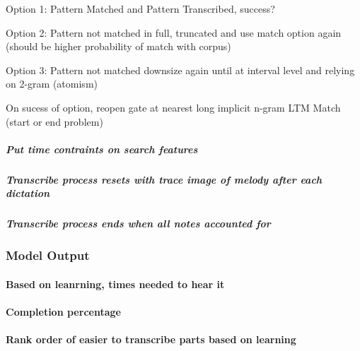 \documentclass[]{book}
\let\oldparagraph\paragraph
\renewcommand{\paragraph}[1]{\oldparagraph{#1}\mbox{}}
\let\oldsubparagraph\subparagraph
\renewcommand{\subparagraph}[1]{\oldsubparagraph{#1}\mbox{}}
\theoremstyle{definition}
\theoremstyle{definition}
\theoremstyle{definition}
\theoremstyle{remark}
\begin{document}
Option 1: Pattern Matched and Pattern Transcribed, success?

Option 2: Pattern not matched in full, truncated and use match option
again (should be higher probability of match with corpus)

Option 3: Pattern not matched downsize again until at interval level and
relying on 2-gram (atomism)

On sucess of option, reopen gate at nearest long implicit n-gram LTM
Match (start or end problem)

\hypertarget{put-time-contraints-on-search-features}{%
\subparagraph{Put time contraints on search
features}\label{put-time-contraints-on-search-features}}

\hypertarget{transcribe-process-resets-with-trace-image-of-melody-after-each-dictation}{%
\subparagraph{Transcribe process resets with trace image of melody after
each
dictation}\label{transcribe-process-resets-with-trace-image-of-melody-after-each-dictation}}

\hypertarget{transcribe-process-ends-when-all-notes-accounted-for}{%
\subparagraph{Transcribe process ends when all notes accounted
for}\label{transcribe-process-ends-when-all-notes-accounted-for}}

\hypertarget{model-output}{%
\subsubsection{Model Output}\label{model-output}}

\hypertarget{based-on-leanrning-times-needed-to-hear-it}{%
\paragraph{Based on leanrning, times needed to hear
it}\label{based-on-leanrning-times-needed-to-hear-it}}

\hypertarget{completion-percentage}{%
\paragraph{Completion percentage}\label{completion-percentage}}

\hypertarget{rank-order-of-easier-to-transcribe-parts-based-on-learning}{%
\paragraph{Rank order of easier to transcribe parts based on
learning}\label{rank-order-of-easier-to-transcribe-parts-based-on-learning}}
\end{document}
